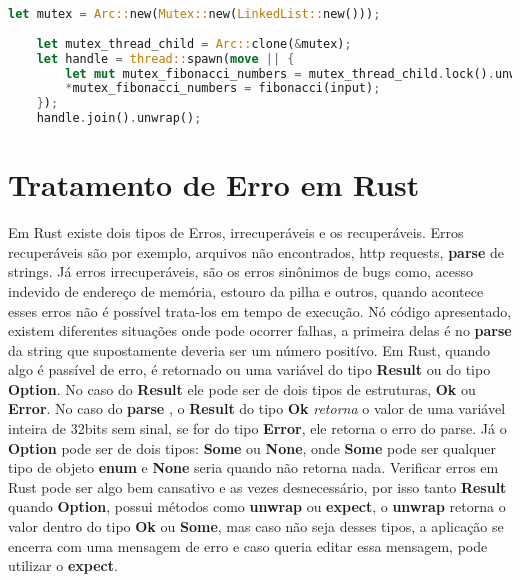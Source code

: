 \documentclass{article}
\begin{document}
  \begin{lstlisting}[language=Rust, label={mutex}, caption=Programação paralela , style=customRust]
    let mutex = Arc::new(Mutex::new(LinkedList::new()));
  
    let mutex_thread_child = Arc::clone(&mutex);
    let handle = thread::spawn(move || {
        let mut mutex_fibonacci_numbers = mutex_thread_child.lock().unwrap();
        *mutex_fibonacci_numbers = fibonacci(input);
    });
    handle.join().unwrap();
  \end{lstlisting}


  
\newpage

\section*{Tratamento de Erro em Rust}
Em Rust existe dois tipos de Erros, irrecuperáveis e os recuperáveis. Erros recuperáveis
são por exemplo, arquivos não encontrados, http requests,  \textbf{parse} de strings.
Já erros irrecuperáveis, são os erros sinônimos de bugs como, acesso indevido de endereço de memória,
estouro da pilha e outros, quando acontece esses erros não é possível trata-los em tempo de execução.
Nó código apresentado, existem diferentes situações onde pode ocorrer falhas, a primeira delas é no
\textbf{parse} da string que supostamente deveria ser um número positívo. Em Rust, quando algo é passível
de erro, é retornado ou uma variável do tipo \textbf{Result} ou do tipo \textbf{Option}. No caso do \textbf{Result}
ele pode ser de dois tipos de estruturas, \textbf{Ok} ou \textbf{Error}. No caso do \textbf{parse} , o \textbf{Result} do tipo \textbf{Ok} 
\textit{retorna} o valor de uma variável inteira de 32bits sem sinal, se for do tipo \textbf{Error}, ele retorna o erro do parse. Já o
\textbf{Option} pode ser de dois tipos: \textbf{Some} ou \textbf{None}, onde \textbf{Some} pode ser qualquer tipo de objeto \textbf{enum}
e \textbf{None} seria quando não retorna nada. Verificar erros em Rust pode ser algo bem cansativo e as vezes desnecessário, por isso
tanto \textbf{Result} quando \textbf{Option}, possui métodos como \textbf{unwrap} ou \textbf{expect}, o \textbf{unwrap} retorna o valor
dentro do tipo \textbf{Ok} ou \textbf{Some}, mas caso não seja desses tipos, a aplicação se encerra com uma mensagem de erro e caso
queria editar essa mensagem, pode utilizar o \textbf{expect}.
\end{document}
